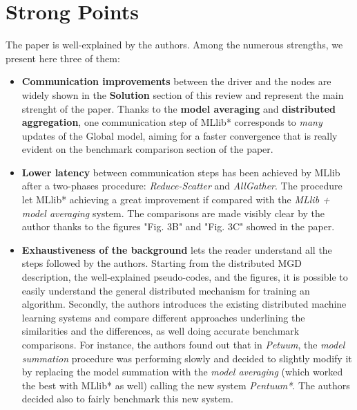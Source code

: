 \documentclass[10pt]{proc}
\begin{document}
\section{Strong Points}
The paper is well-explained by the authors. Among the numerous strengths, we present here three of them:
\begin{itemize}
    \item \textbf{Communication improvements} between the driver and the nodes are widely shown in the \textbf{Solution} section of this review and represent the main strenght of the paper. Thanks to the \textbf{model averaging} and \textbf{distributed aggregation}, one communication step of MLlib* corresponds to \textit{many} updates of the Global model, aiming for a faster convergence that is really evident on the benchmark comparison section of the paper.
    \item \textbf{Lower latency} between communication steps has been achieved by MLlib after a two-phases procedure: \textit{Reduce-Scatter} and \textit{AllGather}. The procedure let MLlib* achieving a great improvement if compared with the \textit{MLlib + model averaging} system. The comparisons are made visibly clear by the author thanks to the figures "Fig. 3B" and "Fig. 3C" showed in the paper. 
    \item \textbf{Exhaustiveness of the background} lets the reader understand all the steps followed by the authors. Starting from the distributed MGD description, the well-explained pseudo-codes, and the figures, it is possible to easily understand the general distributed mechanism for training an algorithm. Secondly, the authors introduces the existing distributed machine learning systems and compare different approaches underlining the similarities and the differences, as well doing accurate benchmark comparisons. For instance, the authors found out that in \textit{Petuum}, the \textit{model summation} procedure was performing slowly and decided to slightly modify it by replacing the model summation with the \textit{model averaging} (which worked the best with MLlib* as well) calling the new system \textit{Pentuum*}. The authors decided also to fairly benchmark this new system.
\end{itemize}
\end{document}
